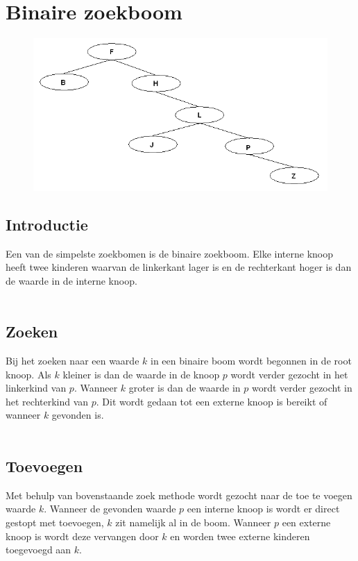 \chapter{Binaire zoekboom}
\label{sec:Hoofdstuk 2}

\begin{figure}[h]
	\centering
		\includegraphics[width=\textwidth]{chap2/binarytree}
	\label{fig:binarytree}
\end{figure}

\section{Introductie}
Een van de simpelste zoekbomen is de binaire zoekboom. Elke interne knoop heeft twee kinderen waarvan de linkerkant lager is en de rechterkant hoger is dan de waarde in de interne knoop.\\
\\
\section{Zoeken}
Bij het zoeken naar een waarde $k$ in een binaire boom wordt begonnen in de root knoop. Als $k$ kleiner is dan de waarde in de knoop $p$ wordt verder gezocht in het linkerkind van $p$. Wanneer $k$ groter is dan de waarde in $p$ wordt verder gezocht in het rechterkind van $p$. Dit wordt gedaan tot een externe knoop is bereikt of wanneer $k$ gevonden is.\\
\\
\section{Toevoegen}
Met behulp van bovenstaande zoek methode wordt gezocht naar de toe te voegen waarde $k$. Wanneer de gevonden waarde $p$ een interne knoop is wordt er direct gestopt met toevoegen, $k$ zit namelijk al in de boom. Wanneer $p$ een externe knoop is wordt deze vervangen door $k$ en worden twee externe kinderen toegevoegd aan $k$.\\

